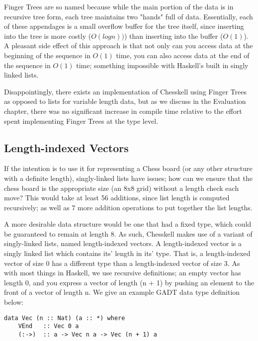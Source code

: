 \documentclass[12pt, a4paper, bibliography=totocnumbered]{scrreprt}
\begin{document}
Finger Trees are so named because while the main portion of the data is in recursive tree form, each tree maintains two "hands" full of data. Essentially, each of these appendages is a small overflow buffer for the tree itself, since inserting into the tree is more costly ($O(log n))$) than inserting into the buffer ($O(1)$). A pleasant side effect of this approach is that not only can you access data at the beginning of the sequence in $O(1)$ time, you can also access data at the end of the sequence in $O(1)$ time; something impossible with Haskell's built in singly linked lists.

Disappointingly, there exists an implementation of Chesskell using Finger Trees as opposed to lists for variable length data, but as we discuss in the Evaluation chapter, there was no significant increase in compile time relative to the effort spent implementing Finger Trees at the type level.

\subsection{Length-indexed Vectors}

If the intention is to use it for representing a Chess board (or any other structure with a definite length), singly-linked lists have issues; how can we ensure that the chess board is the appropriate size (an 8x8 grid) without a length check each move? This would take at least 56 additions, since list length is computed recursively; as well as 7 more addition operations to put together the list lengths.

A more desirable data structure would be one that had a fixed type, which could be guaranteed to remain at length 8. As such, Chesskell makes use of a variant of singly-linked lists, named length-indexed vectors. A length-indexed vector is a singly linked list which contains its' length in its' type. That is, a length-indexed vector of size 0 has a different type than a length-indexed vector of size 3. As with most things in Haskell, we use recursive definitions; an empty vector has length 0, and you express a vector of length (n + 1) by pushing an element to the front of a vector of length n. We give an example GADT data type definition below:

\begin{lstlisting}
data Vec (n :: Nat) (a :: *) where
    VEnd   :: Vec 0 a
    (:->)  :: a -> Vec n a -> Vec (n + 1) a
\end{lstlisting}
\end{document}
